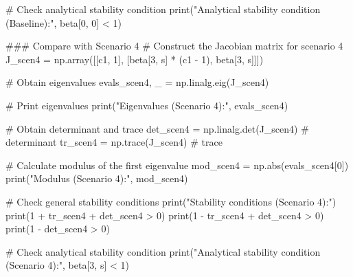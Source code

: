 \documentclass[
  letterpaper,
  DIV=11,
  numbers=noendperiod]{scrreprt}
\newenvironment{Shaded}{\begin{snugshade}}{\end{snugshade}}
\newcommand{\BuiltInTok}[1]{\textcolor[rgb]{0.00,0.23,0.31}{#1}}
\newcommand{\CommentTok}[1]{\textcolor[rgb]{0.37,0.37,0.37}{#1}}
\newcommand{\DecValTok}[1]{\textcolor[rgb]{0.68,0.00,0.00}{#1}}
\newcommand{\NormalTok}[1]{\textcolor[rgb]{0.00,0.23,0.31}{#1}}
\newcommand{\OperatorTok}[1]{\textcolor[rgb]{0.37,0.37,0.37}{#1}}
\newcommand{\StringTok}[1]{\textcolor[rgb]{0.13,0.47,0.30}{#1}}
\begin{document}
\begin{tcolorbox}
\begin{Shaded}
\begin{Highlighting}[]
\CommentTok{\# Check analytical stability condition}
\BuiltInTok{print}\NormalTok{(}\StringTok{"Analytical stability condition (Baseline):"}\NormalTok{, beta[}\DecValTok{0}\NormalTok{, }\DecValTok{0}\NormalTok{] }\OperatorTok{\textless{}} \DecValTok{1}\NormalTok{)}


\CommentTok{\#\#\# Compare with Scenario 4}
\CommentTok{\# Construct the Jacobian matrix for scenario 4}
\NormalTok{J\_scen4 }\OperatorTok{=}\NormalTok{ np.array([[c1, }\DecValTok{1}\NormalTok{],}
\NormalTok{                    [beta[}\DecValTok{3}\NormalTok{, s] }\OperatorTok{*}\NormalTok{ (c1 }\OperatorTok{{-}} \DecValTok{1}\NormalTok{), beta[}\DecValTok{3}\NormalTok{, s]]])}

\CommentTok{\# Obtain eigenvalues}
\NormalTok{evals\_scen4, \_ }\OperatorTok{=}\NormalTok{ np.linalg.eig(J\_scen4)}

\CommentTok{\# Print eigenvalues}
\BuiltInTok{print}\NormalTok{(}\StringTok{"Eigenvalues (Scenario 4):"}\NormalTok{, evals\_scen4)}

\CommentTok{\# Obtain determinant and trace}
\NormalTok{det\_scen4 }\OperatorTok{=}\NormalTok{ np.linalg.det(J\_scen4)  }\CommentTok{\# determinant}
\NormalTok{tr\_scen4 }\OperatorTok{=}\NormalTok{ np.trace(J\_scen4)  }\CommentTok{\# trace}

\CommentTok{\# Calculate modulus of the first eigenvalue}
\NormalTok{mod\_scen4 }\OperatorTok{=}\NormalTok{ np.}\BuiltInTok{abs}\NormalTok{(evals\_scen4[}\DecValTok{0}\NormalTok{])}
\BuiltInTok{print}\NormalTok{(}\StringTok{"Modulus (Scenario 4):"}\NormalTok{, mod\_scen4)}

\CommentTok{\# Check general stability conditions}
\BuiltInTok{print}\NormalTok{(}\StringTok{"Stability conditions (Scenario 4):"}\NormalTok{)}
\BuiltInTok{print}\NormalTok{(}\DecValTok{1} \OperatorTok{+}\NormalTok{ tr\_scen4 }\OperatorTok{+}\NormalTok{ det\_scen4 }\OperatorTok{\textgreater{}} \DecValTok{0}\NormalTok{)}
\BuiltInTok{print}\NormalTok{(}\DecValTok{1} \OperatorTok{{-}}\NormalTok{ tr\_scen4 }\OperatorTok{+}\NormalTok{ det\_scen4 }\OperatorTok{\textgreater{}} \DecValTok{0}\NormalTok{)}
\BuiltInTok{print}\NormalTok{(}\DecValTok{1} \OperatorTok{{-}}\NormalTok{ det\_scen4 }\OperatorTok{\textgreater{}} \DecValTok{0}\NormalTok{)}

\CommentTok{\# Check analytical stability condition}
\BuiltInTok{print}\NormalTok{(}\StringTok{"Analytical stability condition (Scenario 4):"}\NormalTok{, beta[}\DecValTok{3}\NormalTok{, s] }\OperatorTok{\textless{}} \DecValTok{1}\NormalTok{)}


\end{Highlighting}
\end{Shaded}
\end{tcolorbox}
\end{document}
